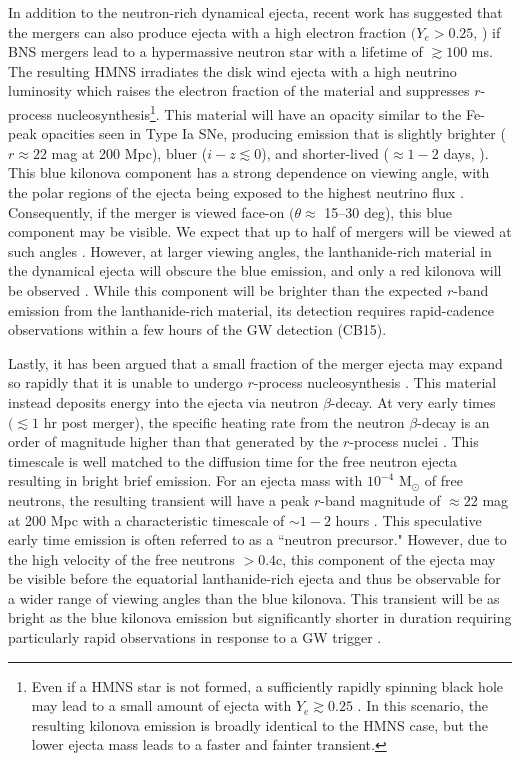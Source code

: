 In addition to the neutron-rich dynamical ejecta, recent work has suggested that the mergers can also produce ejecta with a high electron fraction $(Y_e > 0.25$,  \citealt{Wanajo+14,Goriely+15}) if BNS mergers lead to a hypermassive neutron star \citep[HMNS; see e.g.,][]{Sekiguchi+11} with a lifetime of $\gtrsim 100$ ms. The resulting HMNS irradiates the disk wind ejecta with a high neutrino luminosity which raises the electron fraction of the material and suppresses $r$-process nucleosynthesis\footnote{Even if a HMNS star is not formed, a sufficiently rapidly spinning black hole may lead to a small amount of ejecta with $Y_e \gtrsim 0.25$ \citep[see e.g.,][]{FernandezMetzger13,Fernandez+15}. In this scenario, the resulting kilonova emission is broadly identical to the HMNS case, but the lower ejecta mass leads to a faster and fainter transient.}. This material will have an opacity similar to the Fe-peak opacities seen in Type Ia SNe, producing emission that is slightly brighter ($r \approx 22$ mag at 200 Mpc), bluer ($i-z \lesssim 0$), and shorter-lived ($\approx 1-2$ days, \citealt{MetzgerFernandez14,Kasen+15}). This blue kilonova component has a strong dependence on viewing angle, with the polar regions of the ejecta being exposed to the highest neutrino flux \citep{MetzgerFernandez14,Kasen+15}. Consequently, if the merger is viewed face-on $(\theta \approx$ 15--30 deg), this blue component may be visible. We expect that up to half of mergers will be viewed at such angles \citep[see e.g.,][]{MetzgerBerger12}. However, at larger viewing angles, the lanthanide-rich material in the dynamical ejecta will obscure the blue emission, and only a red kilonova will be observed \citep{Kasen+15,Metzger2017}. While this component will be brighter than the expected $r$-band emission from the lanthanide-rich material, its detection requires rapid-cadence observations within a few hours of the GW detection (CB15).

Lastly, it has been argued that a small fraction of the merger ejecta may expand so rapidly that it is unable to undergo $r$-process nucleosynthesis \citep{Bauswein+13a}. This material instead deposits energy into the ejecta via neutron $\beta$-decay. At very early times $(\lesssim 1$ hr post merger), the specific heating rate from the neutron $\beta$-decay is an order of magnitude higher than that generated by the $r$-process nuclei \citep{Metzger2017}. This timescale is well matched to the diffusion time for the free neutron ejecta resulting in bright brief emission. For an ejecta mass with $10^{-4}$ M$_{\odot}$ of free neutrons, the resulting transient will have a peak $r$-band magnitude of $\approx 22$ mag at 200 Mpc with a characteristic timescale of $\sim 1-2$ hours \citep{Metzger+15}. This speculative early time emission is often referred to as a ``neutron precursor." However, due to the high velocity of the free neutrons $>0.4$c, this component of the ejecta may be visible before the equatorial lanthanide-rich ejecta and thus be observable for a wider range of viewing angles than the blue kilonova. This transient will be as bright as the blue kilonova emission but significantly shorter in duration requiring particularly rapid observations in response to a GW trigger .

